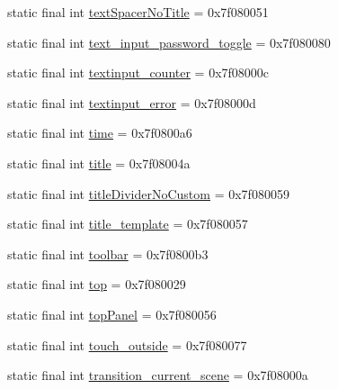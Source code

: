 \begin{CompactItemize}
\item 
static final int \hyperlink{classandroid_1_1support_1_1graphics_1_1drawable_1_1animated_1_1_r_1_1id_5e68be1b7e701422769031c18a082a80}{textSpacerNoTitle} = 0x7f080051
\item 
static final int \hyperlink{classandroid_1_1support_1_1graphics_1_1drawable_1_1animated_1_1_r_1_1id_15729236bd06e9f44e9b75ac8582349e}{text\_\-input\_\-password\_\-toggle} = 0x7f080080
\item 
static final int \hyperlink{classandroid_1_1support_1_1graphics_1_1drawable_1_1animated_1_1_r_1_1id_a74fb83e734e15e7d081a3353f229911}{textinput\_\-counter} = 0x7f08000c
\item 
static final int \hyperlink{classandroid_1_1support_1_1graphics_1_1drawable_1_1animated_1_1_r_1_1id_215e6375ff8dc7fd96c76aad462bae43}{textinput\_\-error} = 0x7f08000d
\item 
static final int \hyperlink{classandroid_1_1support_1_1graphics_1_1drawable_1_1animated_1_1_r_1_1id_d0105d8d2f220c019b5cbc2cd06005a2}{time} = 0x7f0800a6
\item 
static final int \hyperlink{classandroid_1_1support_1_1graphics_1_1drawable_1_1animated_1_1_r_1_1id_48564599da1f4ff6f8059378dc61982a}{title} = 0x7f08004a
\item 
static final int \hyperlink{classandroid_1_1support_1_1graphics_1_1drawable_1_1animated_1_1_r_1_1id_c51d5fa86c6535398f377214578d927c}{titleDividerNoCustom} = 0x7f080059
\item 
static final int \hyperlink{classandroid_1_1support_1_1graphics_1_1drawable_1_1animated_1_1_r_1_1id_35cc3d2e232e397c98977598bab2544b}{title\_\-template} = 0x7f080057
\item 
static final int \hyperlink{classandroid_1_1support_1_1graphics_1_1drawable_1_1animated_1_1_r_1_1id_0bcd34416bcb85d82d13a606c686a76c}{toolbar} = 0x7f0800b3
\item 
static final int \hyperlink{classandroid_1_1support_1_1graphics_1_1drawable_1_1animated_1_1_r_1_1id_ef2164bdfb73673c8614fc942c4ba128}{top} = 0x7f080029
\item 
static final int \hyperlink{classandroid_1_1support_1_1graphics_1_1drawable_1_1animated_1_1_r_1_1id_e2c3f4abe62e9d101114e366aadc4491}{topPanel} = 0x7f080056
\item 
static final int \hyperlink{classandroid_1_1support_1_1graphics_1_1drawable_1_1animated_1_1_r_1_1id_365f907ff8b26e516f13292924971df5}{touch\_\-outside} = 0x7f080077
\item 
static final int \hyperlink{classandroid_1_1support_1_1graphics_1_1drawable_1_1animated_1_1_r_1_1id_58fb745b9d393ffc5acb76c300d79c4c}{transition\_\-current\_\-scene} = 0x7f08000a

\end{CompactItemize}
